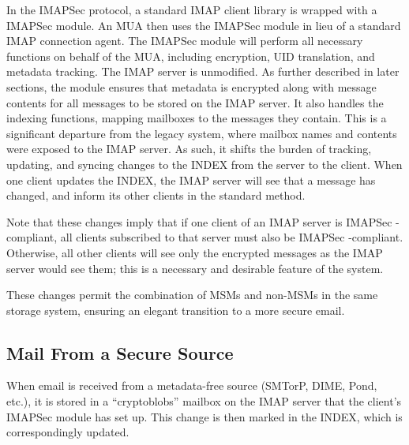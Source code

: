 \documentclass[pageno]{jpaper}
\newcommand{\project}{IMAPSec }
\begin{document}
In the \project protocol, a standard IMAP client library is wrapped with a \project module. An MUA then uses the \project module in lieu of a standard IMAP connection agent. The \project module will perform all necessary functions on behalf of the MUA, including encryption, UID translation, and metadata tracking. The IMAP server is unmodified.
As further described in later sections, the module ensures that metadata is encrypted along with message contents for all messages to be stored on the IMAP server. It also handles the indexing functions, mapping mailboxes to the messages they contain. This is a significant departure from the legacy system, where mailbox names and contents were exposed to the IMAP server. As such, it shifts the burden of tracking, updating, and syncing changes to the INDEX from the server to the client. When one client updates the INDEX, the IMAP server will see that a message has changed, and inform its other clients in the standard method. 


Note that these changes imply that if one client of an IMAP server is \project-compliant, all clients subscribed to that server must also be \project-compliant. Otherwise, all other clients will see only the encrypted messages as the IMAP server would see them; this is a necessary and desirable feature of the system.

These changes permit the combination of MSMs and non-MSMs in the same storage system, ensuring an elegant transition to a more secure email.

\label{mail-from-secure}
\subsection{Mail From a Secure Source}
When email is received from a metadata-free source (SMTorP, DIME, Pond, etc.), it is stored in a ``cryptoblobs'' mailbox on the IMAP server that the client's \project module has set up. This change is then marked in the INDEX, which is correspondingly updated.
\end{document}
